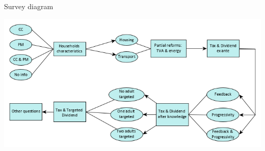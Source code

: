 \documentclass[aspectratio=169,9pt,dvipsnames]{beamer}
\begin{document}

\begin{frame}{Survey diagram}\label{survey_diagram}

\includegraphics[scale=0.43,left]{Images/diagram_survey.png}

\hyperlink{data_and_policy}{}



\end{frame}
\end{document}
